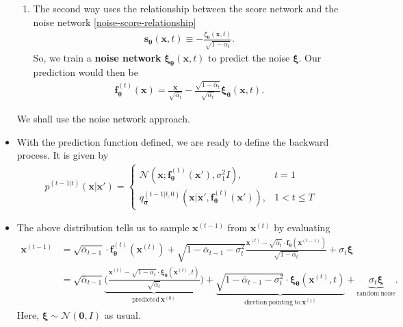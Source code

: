 \documentclass[10pt]{article}
\newcommand{\ve}[1]{\mathbf{#1}}
\newcommand{\mrm}[1]{\mathrm{#1}}
\newcommand{\ves}[1]{\boldsymbol{#1}}
\newcommand{\mcal}[1]{\mathcal{#1}}
\begin{document}
\begin{itemize}
\begin{enumerate}
    \item The second way uses the relationship between the score network and the noise network \eqref{noise-score-relationship}
    \begin{align*}
      \ve{s}_{\ves{\theta}}(\ve{x}, t) \equiv -\frac{\xi_{\ves{\theta}}(\ve{x}, t)}{\sqrt{1 - \overline{\alpha}_t}}.
    \end{align*}
    So, we train a {\bf noise network} $\ves{\xi}_{\ves{\theta}}(\ve{x},t)$ to predict the noise $\ves{\xi}$. Our prediction would then be
    \begin{align*}
      \ve{f}^{(t)}_{\ves{\theta}}(\ve{x}) = \frac{\ve{x}}{\sqrt{\overline{\alpha}_t}} - \frac{\sqrt{1 - \overline{\alpha}_t}}{{\sqrt{\overline{\alpha}_t}} } \ves{\xi}_{\ves{\theta}}(\ve{x}, t).
    \end{align*}
  \end{enumerate}  
  We shall use the noise network approach.
  
  \item With the prediction function defined, we are ready to define the backward process. It is given by
  \begin{align*}
    p^{(t-1|t)}(\ve{x}|\ve{x}') =
    \begin{cases}
      \mcal{N}(\ve{x}; \ve{f}_{\ves{\theta}}^{(1)}(\ve{x}'), \sigma^2_1 I), & t = 1 \\
      q_{\ves{\sigma}}^{(t-1|t,0)}(\ve{x}|\ve{x}',\ve{f}^{(t)}_{\ves{\theta}}(\ve{x}')), & 1 < t \leq T
    \end{cases}
  \end{align*}

  \item The above distribution tells us to sample $\ve{x}^{(t-1)}$ from $\ve{x}^{(t)}$ by evaluating
  \begin{align*}
    \ve{x}^{(t-1)} 
    &= \sqrt{\overline{\alpha}_{t-1}} \cdot \ve{f}_{\ves{\theta}}^{(t)}(\ve{x}^{(t)}) 
    + \sqrt{1 - \overline{\alpha}_{t-1} - \sigma_t^2} \frac{\ve{x}^{(t)} - \sqrt{\overline{\alpha}_t}\cdot\ve{f}_{\ves{\theta}}(\ve{x}^{(t-1)})}{\sqrt{1 - \overline{\alpha}_t}}
    + \sigma_t \ves{\xi} \\
    &= \sqrt{\overline{\alpha}_{t-1}} \underbrace{\bigg( \frac{\ve{x}^{(t)} - \sqrt{1 - \overline{\alpha}_{t}} \cdot \ves{\xi}_{\ves{\theta}}(\ve{x}^{(t)}, t)}{\sqrt{\overline{\alpha}_t}} \bigg)}_{\mrm{predicted}\ \ve{x}^{(0)}}
    + \underbrace{\sqrt{1 - \overline{\alpha}_{t-1} - \sigma_t^2} \cdot \ves{\xi}_{\ves{\theta}}(\ve{x}^{(t)}, t)}_{\mrm{diretion}\ \mrm{pointing}\ \mrm{to}\ \ve{x}^{(t)}}
    + \underbrace{\sigma_t \ves{\xi}}_{\mrm{random}\ \mrm{noise}}.
  \end{align*}
  Here, $\ves{\xi} \sim \mcal{N}(\ve{0},I)$ as usual.


\end{itemize}
\end{document}
